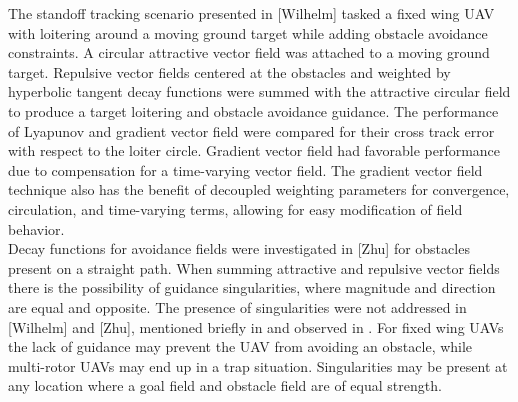 \documentclass[conf]{new-aiaa}
\begin{document}
The standoff tracking scenario presented in [Wilhelm] tasked a fixed wing UAV with loitering around a moving ground target while adding obstacle avoidance constraints. A circular attractive vector field was attached to a moving ground target. Repulsive vector fields centered at the obstacles and weighted by hyperbolic tangent decay functions were summed with the attractive circular field to produce a target loitering and obstacle avoidance guidance. The performance of Lyapunov \cite{frew_cooperative_2007} and gradient vector field \cite{goncalves_artificial_2009,goncalves_circulation_2010,goncalves_vector_2010} were compared for their cross track error with respect to the loiter circle. Gradient vector field had favorable performance due to compensation for a time-varying vector field. The gradient vector field technique also has the benefit of decoupled weighting parameters for convergence, circulation, and time-varying terms, allowing for easy modification of field behavior. \\

Decay functions for avoidance fields were investigated in [Zhu] for obstacles present on a straight path. When summing attractive and repulsive vector fields there is the possibility of guidance singularities, where magnitude and direction are equal and opposite. The presence of singularities were not addressed in [Wilhelm] and [Zhu], mentioned briefly in \cite{nelson_cooperative_2005} and observed in \cite{panagou_motion_2014}. For fixed wing UAVs the lack of guidance may prevent the UAV from avoiding an obstacle, while multi-rotor UAVs may end up in a trap situation. Singularities may be present at any location where a goal field and obstacle field are of equal strength. \\



%
%
%
% 
\end{document}
